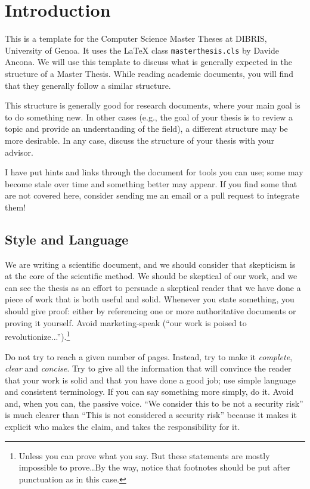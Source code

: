 \chapter{Introduction}
\label{sec:introduction}

This is a template for the Computer Science Master Theses at \ac{DIBRIS},
University of Genoa. It uses the \xspace{\LaTeX} class \texttt{masterthesis.cls} by
Davide Ancona. We will use this template to discuss what is generally expected in the
structure of a Master Thesis. While reading academic documents, you will find that
they generally follow a similar structure.

This structure is generally good for research documents, where your main goal is to do
something new. In other cases (e.g., the goal of your thesis is to review a topic and provide
an understanding of the field), a different structure may be more desirable. In any case,
discuss the structure of your thesis with your advisor.

I have put hints and links through the document for tools you can use; some may become stale over time and something better may appear. If you find some that are not covered here, consider sending me an email or a pull request to integrate them!

\section{Style and Language}

We are writing a scientific document, and we should consider that skepticism
is at the core of the scientific method. We should be skeptical of our work, and
we can see the thesis as an effort to persuade a skeptical reader that we have done
a piece of work that is both useful and solid. Whenever you state something, you should give proof:
either by referencing one or more authoritative documents or proving it yourself.
Avoid marketing-speak (``our work is poised to revolutionize...'').\footnote{Unless you can
prove what you say. But these statements are mostly impossible to prove\ldots By the
way, notice that footnotes should be put after punctuation as in this case.}

Do not try to reach a given number of pages. Instead, try to make it
\emph{complete}, \emph{clear} and \emph{concise}. Try to give all the information that will
convince the reader that your work is solid and that you have done a good job; use simple
language and consistent terminology.
If you can say something more simply, do it. Avoid
 and, when you can, the passive voice.
``We consider this to be not a security risk'' is much clearer than ``This is not considered a
security risk'' because it makes it explicit who makes the claim, and takes the responsibility for
it.

